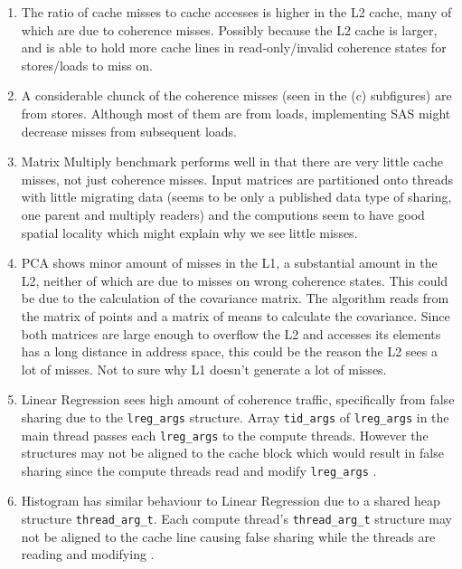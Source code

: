 \begin{enumerate}
	\item The ratio of cache misses to cache accesses is higher in the L2 cache, many of which are due to coherence misses. Possibly because the L2 cache is larger, and is able to hold more cache lines in read-only/invalid coherence states for stores/loads to miss on.
	\item A considerable chunck of the coherence misses (seen in the (c) subfigures) are from stores. Although most of them are from loads, implementing SAS might decrease misses from subsequent loads.
	\item Matrix Multiply benchmark performs well in that there are very little cache misses, not just coherence misses. Input matrices are partitioned onto threads with little migrating data (seems to be only a published data type of sharing, one parent and multiply readers) and the computions seem to have good spatial locality which might explain why we see little misses.
	\item PCA shows minor amount of misses in the L1, a substantial amount in the L2, neither of which are due to misses on wrong coherence states. This could be due to the calculation of the covariance matrix. The algorithm reads from the matrix of points and a matrix of means to calculate the covariance. Since both matrices are large enough to overflow the L2 and accesses its elements has a long distance in address space, this could be the reason the L2 sees a lot of misses. Not to sure why L1 doesn't generate a lot of misses.
	\item Linear Regression sees high amount of coherence traffic, specifically from false sharing due to the \texttt{lreg\_args} structure. Array \texttt{tid\_args} of \texttt{lreg\_args} in the main thread passes each \texttt{lreg\_args} to the compute threads. However the structures may not be aligned to the cache block which would result in false sharing since the compute threads read and modify \texttt{lreg\_args} \cite{Liu:2011, Liu:2014}.
	\item Histogram has similar behaviour to Linear Regression due to a shared heap structure \texttt{thread\_arg\_t}. Each compute thread's \texttt{thread\_arg\_t} structure may not be aligned to the cache line causing false sharing while the threads are reading and modifying \cite{Liu:2014}.
\end{enumerate}


